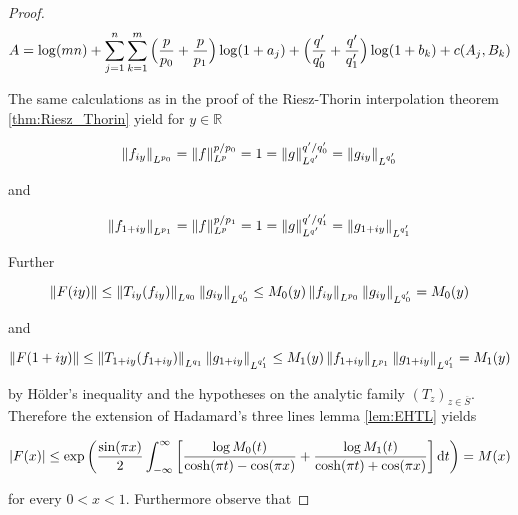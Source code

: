 \begin{proof}
		\begin{equation*}
			A =  \log( mn ) + \sum_{j = 1}^n\sum_{k = 1}^m\del[2]{ \frac{p}{p_0} + \frac{p}{p_1}}\log(1 + a_j) + \del[2]{ \frac{q'}{q'_0} + \frac{q'}{q'_1} } \log( 1 + b_k) + c(A_j,B_k)
	\end{equation*}

	The same calculations as in the proof of the Riesz-Thorin interpolation theorem \ref{thm:Riesz_Thorin} yield for $y \in \mathbb{R}$

	\begin{equation*}
		\norm[0]{ f_{iy}}_{L^{p_0}} = \norm[0]{ f}^{p/p_0}_{L^p} = 1 = \norm[0]{ g}_{L^{q'}}^{q'/q'_0} = \norm[0]{ g_{iy}}_{L^{q_0'}}
	\end{equation*}

	\noindent and

	\begin{equation*}
		\norm[0]{ f_{1 + iy}}_{L^{p_1}} = \norm[0]{ f}^{p/p_1}_{L^p} = 1 = \norm[0]{ g}_{L^{q'}}^{q'/q'_1} = \norm[0]{ g_{1 + iy}}_{L^{q_1'}}
	\end{equation*}

	Further

	\begin{equation*}
		\norm[0]{ F(iy)} \leq \norm[0]{ T_{iy}(f_{iy})}_{L^{q_0}} \norm[0]{ g_{iy}}_{L^{q'_0}} \leq M_0(y) \norm[0]{f_{iy}}_{L^{p_0}}\norm[0]{ g_{iy}}_{L^{q_0'}} = M_0(y)
	\end{equation*}

	\noindent and

	\begin{equation*}
		\norm[0]{ F(1 + iy)} \leq \norm[0]{ T_{1 + iy}(f_{1 + iy})}_{L^{q_1}} \norm[0]{ g_{1 + iy}}_{L^{q'_1}} \leq M_1(y) \norm[0]{f_{1 + iy}}_{L^{p_1}}\norm[0]{ g_{1 + iy}}_{L^{q_1'}} = M_1(y)
	\end{equation*}

	\noindent by H\"older's inequality and the hypotheses on the analytic family $(T_z)_{z \in \overline{S}}$. Therefore the extension of Hadamard's three lines lemma \ref{lem:EHTL} yields

	\begin{equation*}
		\abs[0]{ F(x)} \leq \exp\del[3]{ \frac{\sin(\pi x)}{2} \int_{-\infty}^\infty \sbr[3]{ \frac{\log M_0(t)}{\cosh(\pi t) - \cos(\pi x)} + \frac{\log M_1(t)}{\cosh(\pi t) + \cos(\pi x)}} \d t } = M(x)
	\end{equation*}

	\noindent for every $0 < x < 1$. Furthermore observe that


\end{proof}
